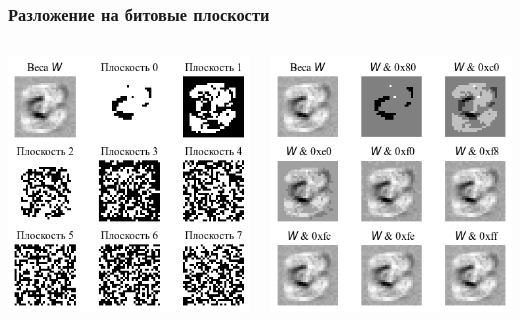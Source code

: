 \begin{frame}[t]
\frametitle{Разложение на битовые плоскости}
\begin{columns}
    \hspace{5mm}
    \centering 
    \begin{block}{}
        \vspace{3mm}
        \centering\includegraphics[height = 0.6\textheight]{pics/output1.png} 
    \end{block}
     
    \centering 
    \begin{block}{}
        \vspace{3mm}
        \centering\includegraphics[height = 0.6\textheight]{pics/output.png} 
    \end{block}
\end{columns}
\end{frame}




